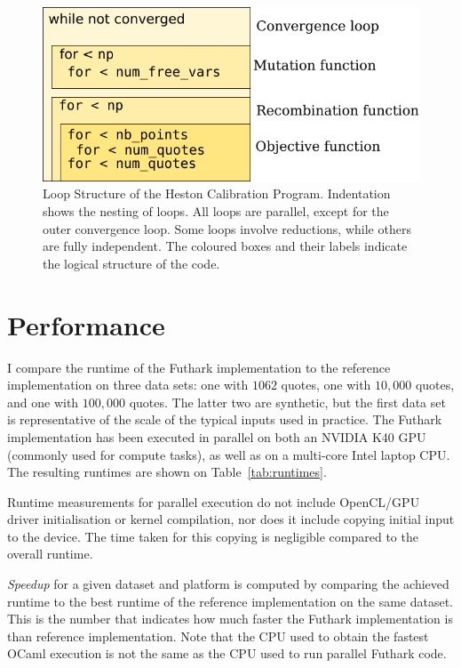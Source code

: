\documentclass{article}
\begin{document}
\begin{figure}
  \centering
  \includegraphics{loopstructure.pdf}
  \caption{Loop Structure of the Heston Calibration Program.
    Indentation shows the nesting of loops.  All loops are parallel,
    except for the outer convergence loop.  Some loops involve
    reductions, while others are fully independent.  The coloured
    boxes and their labels indicate the logical structure of the
    code.}
  \label{fig:loopstructure}
\end{figure}

\section{Performance}

I compare the runtime of the Futhark implementation to the reference
implementation on three data sets: one with $1062$ quotes, one with
$10,000$ quotes, and one with $100,000$ quotes.  The latter two are
synthetic, but the first data set is representative of the scale of
the typical inputs used in practice.  The Futhark implementation has
been executed in parallel on both an NVIDIA K40 GPU (commonly used for
compute tasks), as well as on a multi-core Intel laptop CPU. The
resulting runtimes are shown on Table~\ref{tab:runtimes}.

Runtime measurements for parallel execution do not include OpenCL/GPU
driver initialisation or kernel compilation, nor does it include
copying initial input to the device.  The time taken for this copying
is negligible compared to the overall runtime.

\textit{Speedup} for a given dataset and platform is computed by
comparing the achieved runtime to the best runtime of the reference
implementation on the same dataset.  This is the number that indicates
how much faster the Futhark implementation is than reference
implementation.  Note that the CPU used to obtain the fastest OCaml
execution is not the same as the CPU used to run parallel Futhark
code.
\end{document}

